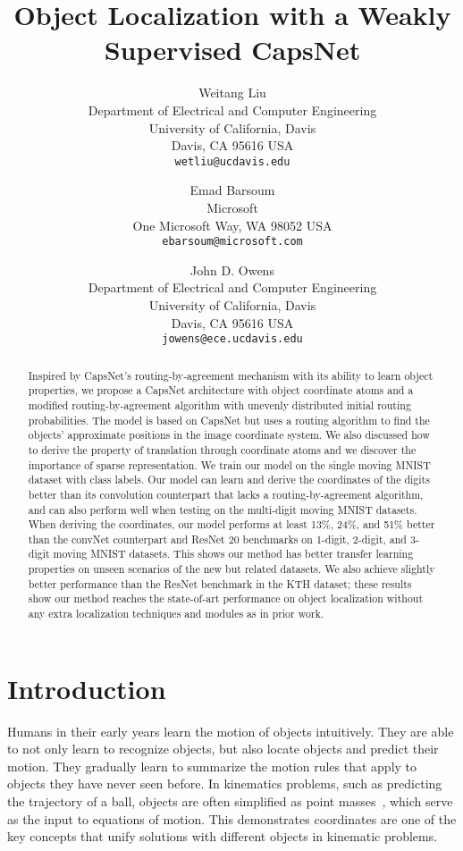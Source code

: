 \documentclass{article}
\title{Object Localization with a Weakly Supervised CapsNet}
\author{
  Weitang Liu\\
  Department of Electrical and Computer Engineering\\
  University of California, Davis\\
  Davis, CA 95616 USA \\
  \texttt{wetliu@ucdavis.edu} \\
  \and
  Emad Barsoum\\
  Microsoft\\
  One Microsoft Way, WA 98052 USA\\
  \texttt{ebarsoum@microsoft.com} \\
  \and
  John D. Owens\\
  Department of Electrical and Computer Engineering\\
  University of California, Davis\\
  Davis, CA 95616 USA\\
  \texttt{jowens@ece.ucdavis.edu}
}
\begin{document}
\maketitle

\begin{abstract}
   Inspired by CapsNet's routing-by-agreement mechanism with its ability to learn object properties, we propose a CapsNet architecture with object coordinate atoms and a modified routing-by-agreement algorithm with unevenly distributed initial routing probabilities. The model is based on CapsNet but uses a routing algorithm to find the objects' approximate positions in the image coordinate system. We also discussed how to derive the property of translation through coordinate atoms and we discover the importance of sparse representation. We train our model on  the single moving MNIST dataset with class labels. Our model can learn and derive the coordinates of the digits better than its convolution counterpart that lacks a routing-by-agreement algorithm, and can also perform well when testing on the multi-digit moving MNIST datasets. When deriving the coordinates, our model performs at least 13\%, 24\%, and 51\% better than the convNet counterpart and ResNet 20 benchmarks on 1-digit, 2-digit, and 3-digit moving MNIST datasets. This shows our method has better transfer learning properties on unseen scenarios of the new but related datasets. We also achieve slightly better performance than the ResNet benchmark in the KTH dataset; these results show our method reaches the state-of-art performance on object localization without any extra localization techniques and modules as in prior work. 
\end{abstract}

\section{Introduction}
Humans in their early years learn the motion of objects intuitively. They are able to not only learn to recognize objects, but also locate objects and predict their motion. They gradually learn to summarize the motion rules that apply to objects they have never seen before. In kinematics problems, such as predicting the trajectory of a ball, objects are often simplified as point masses~\cite{whittaker1988treatise}, which serve as the input to equations of motion. This demonstrates coordinates are one of the key concepts that unify solutions with different objects in kinematic problems. 
\end{document}
